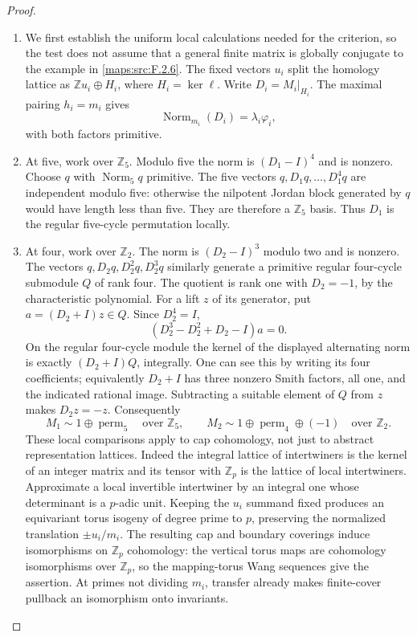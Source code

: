 \documentclass[11pt,a4paper]{article}
\theoremstyle{definition}
\begin{document}
\begin{proof}
\begin{enumerate}[label=\arabic*.]
\item We first establish the uniform local calculations needed
for the criterion, so the test does not assume that a
general finite matrix is globally conjugate to the example
in \ref{maps:src:F.2.6}.
The fixed vectors $u_i$ split the homology lattice as
$\mathbb Zu_i\oplus H_i$, where $H_i=\ker\ell$.
Write $D_i=M_i|_{H_i}$.
The maximal pairing $h_i=m_i$ gives
\[
 \operatorname{Norm}_{m_i}(D_i)=\lambda_i\varphi_i ,
 \tag{F.HC4}\label{maps:eq:F.HC4}
\]
with both factors primitive.

\item At five, work over $\mathbb Z_5$.
Modulo five the norm is $(D_1-I)^4$ and is nonzero.
Choose $q$ with $\operatorname{Norm}_5q$ primitive.
The five vectors $q,D_1q,\ldots,D_1^4q$ are independent
modulo five: otherwise the nilpotent Jordan block generated
by $q$ would have length less than five.
They are therefore a $\mathbb Z_5$ basis.
Thus $D_1$ is the regular five-cycle permutation locally.

\item At four, work over $\mathbb Z_2$.
The norm is $(D_2-I)^3$ modulo two and is nonzero.
The vectors $q,D_2q,D_2^2q,D_2^3q$ similarly generate
a primitive regular four-cycle submodule $Q$ of rank four.
The quotient is rank one with $D_2=-1$, by the
characteristic polynomial.
For a lift $z$ of its generator, put $a=(D_2+I)z\in Q$.
Since $D_2^4=I$,
\[
 (D_2^3-D_2^2+D_2-I)a=0.
\]
On the regular four-cycle module the kernel of the
displayed alternating norm is exactly $(D_2+I)Q$,
integrally.  One can see this by writing its four
coefficients; equivalently $D_2+I$ has three nonzero
Smith factors, all one, and the indicated rational image.
Subtracting a suitable element of $Q$ from $z$ makes
$D_2z=-z$.
Consequently
\[
 M_1\sim 1\oplus\operatorname{perm}_5\quad\text{over }\mathbb Z_5,
 \qquad
 M_2\sim1\oplus\operatorname{perm}_4\oplus(-1)
 \quad\text{over }\mathbb Z_2 .
 \tag{F.HC5}\label{maps:eq:F.HC5}
\]
These local comparisons apply to cap cohomology, not just
to abstract representation lattices.
Indeed the integral lattice of intertwiners is the kernel
of an integer matrix and its tensor with $\mathbb Z_p$
is the lattice of local intertwiners.
Approximate a local invertible intertwiner by an integral
one whose determinant is a $p$-adic unit.
Keeping the $u_i$ summand fixed produces an equivariant
torus isogeny of degree prime to $p$, preserving the
normalized translation $\pm u_i/m_i$.
The resulting cap and boundary coverings induce
isomorphisms on $\mathbb Z_p$ cohomology: the vertical
torus maps are cohomology isomorphisms over $\mathbb Z_p$,
so the mapping-torus Wang sequences give the assertion.
At primes not dividing $m_i$, transfer already makes
finite-cover pullback an isomorphism onto invariants.


\end{enumerate}
\end{proof}
\end{document}
